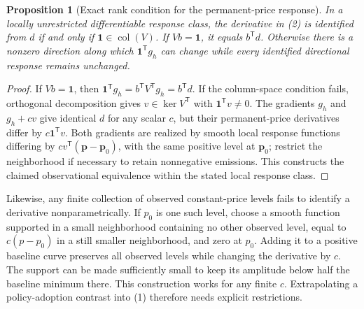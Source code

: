 \documentclass[11pt]{article}
\newtheorem{proposition}[theorem]{Proposition}
\begin{document}
\begin{proposition}[Exact rank condition for the permanent-price response]
In a locally unrestricted differentiable response class, the derivative
in (2) is identified from $d$ if and only if
$\boldsymbol1\in\operatorname{col}(V)$. If $Vb=\boldsymbol1$, it equals
$b^\mathsf Td$. Otherwise there is a nonzero direction along which
$\boldsymbol1^\mathsf Tg_h$ can change while every identified directional
response remains unchanged.
\end{proposition}
\begin{proof}
If $Vb=\boldsymbol1$, then
$\boldsymbol1^\mathsf Tg_h=b^\mathsf TV^\mathsf Tg_h=b^\mathsf Td$.
If the column-space condition fails, orthogonal decomposition gives
$v\in\ker V^\mathsf T$ with $\boldsymbol1^\mathsf Tv\ne0$.
The gradients $g_h$ and $g_h+cv$ give identical $d$ for any scalar $c$,
but their permanent-price derivatives differ by
$c\boldsymbol1^\mathsf Tv$. Both gradients are realized by smooth local
response functions differing by $cv^\mathsf T(\mathbf p-\mathbf p_0)$,
with the same positive level at $\mathbf p_0$; restrict the neighborhood
if necessary to retain nonnegative emissions. This constructs the claimed
observational equivalence within the stated local response class.
\end{proof}

Likewise, any finite collection of observed constant-price levels fails
to identify a derivative nonparametrically. If $p_0$ is one such level,
choose a smooth function supported in a small neighborhood containing no
other observed level, equal to $c(p-p_0)$ in a still smaller neighborhood,
and zero at $p_0$. Adding it to a positive baseline curve preserves all
observed levels while changing the derivative by $c$. The support can be
made sufficiently small to keep its amplitude below half the baseline
minimum there. This construction works for any finite $c$. Extrapolating
a policy-adoption contrast into (1) therefore needs explicit restrictions.
\end{document}
